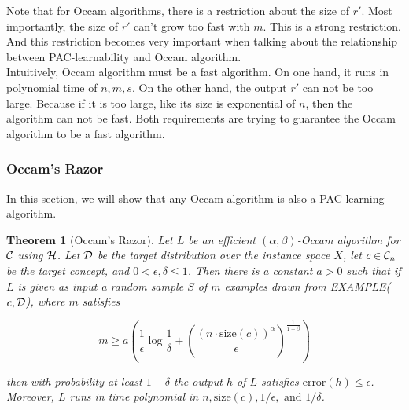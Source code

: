 \documentclass[12pt]{article}
\newtheorem{theorem}{Theorem}
\newcommand{\calc}{{\cal C}}
\newcommand{\cald}{{\cal D}}
\newcommand{\calh}{{\cal H}}
\begin{document}
Note that for Occam algorithms, there is a restriction about the size of $r'$. Most importantly, the size of $r'$ can't grow too fast with $m$. This is a strong restriction. And this restriction becomes very important when talking about the relationship between PAC-learnability and Occam algorithm. \\

Intuitively, Occam algorithm must be a fast algorithm. On one hand, it runs in polynomial time of $n, m, s$. On the other hand, the output $r'$ can not be too large. Because if it is too large, like its size is exponential of $n$, then the algorithm can not be fast. Both requirements are trying to guarantee the Occam algorithm to be a fast algorithm.

\subsubsection{Occam's Razor}

In this section, we will show that any Occam algorithm is also a PAC learning algorithm.

\begin{theorem} [Occam's Razor] \label{theorem:occ}
Let $L$ be an efficient $(\alpha, \beta)$-Occam algorithm for $\calc$ using $\calh$. Let $\cald$ be the target distribution over the instance space $X$, let $c \in \calc_n$ be the target concept, and $0 < \epsilon, \delta \le 1$. Then there is a constant $a > 0$ such that if $L$ is given as input a random sample $S$ of $m$ examples drawn from EXAMPLE($c, \cald$), where $m$ satisfies

\begin{equation*}
m \ge a (\frac {1}{\epsilon} \log {\frac {1}{\delta}} + (\frac {(n \cdot \text {size}(c))^{\alpha}}{\epsilon})^{\frac {1}{1 - \beta}})
\end{equation*}

then with probability at least $1 - \delta$ the output $h$ of $L$ satisfies $\text {error}(h) \le \epsilon$. Moreover, $L$ runs in time polynomial in $n, \text {size}(c), 1/\epsilon, \text{ and } 1/\delta$.
\end{theorem}
\end{document}
